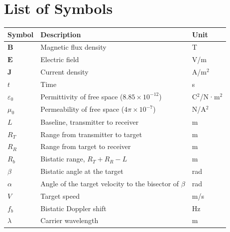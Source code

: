 \chapter{List of Symbols}
\label{ch:symbols}
\noindent
\begin{tabularx}{\textwidth}{@{}l X U@{}}
\toprule
\textbf{Symbol} & \textbf{Description} & \textbf{Unit} \\
\midrule
$\bm{B}$         & Magnetic flux density         & T \\
$\bm{E}$         & Electric field                & V/m \\
$\bm{J}$         & Current density               & A/m$^2$ \\
$t$              & Time                          & s \\
$\varepsilon_0$  & Permittivity of free space ($8.85 \times 10^{-12}$) & C$^2$/N·m$^2$ \\
$\mu_0$          & Permeability of free space ($4\pi \times 10^{-7}$)  & N/A$^2$ \\
$L$              & Baseline, transmitter to receiver          & m \\
$R_T$            & Range from transmitter to target           & m \\
$R_R$            & Range from target to receiver              & m \\
$R_b$            & Bistatic range, $R_T + R_R - L$            & m \\
$\beta$          & Bistatic angle at the target               & rad \\
$\alpha$         & Angle of the target velocity to the bisector of $\beta$ & rad \\
$V$              & Target speed                               & m/s \\
$f_b$            & Bistatic Doppler shift                     & Hz \\
$\lambda$        & Carrier wavelength                         & m \\
\bottomrule
\end{tabularx}
